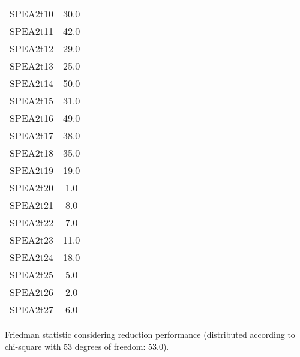 \documentclass{article}
\begin{document}
\begin{table}[!htp]
\begin{tabular}{c|c}
SPEA2t10&30.0\\
SPEA2t11&42.0\\
SPEA2t12&29.0\\
SPEA2t13&25.0\\
SPEA2t14&50.0\\
SPEA2t15&31.0\\
SPEA2t16&49.0\\
SPEA2t17&38.0\\
SPEA2t18&35.0\\
SPEA2t19&19.0\\
SPEA2t20&1.0\\
SPEA2t21&8.0\\
SPEA2t22&7.0\\
SPEA2t23&11.0\\
SPEA2t24&18.0\\
SPEA2t25&5.0\\
SPEA2t26&2.0\\
SPEA2t27&6.0\\
\end{tabular}
\end{table}


Friedman statistic considering reduction performance (distributed according to chi-square with 53 degrees of freedom: 53.0).
\end{document}
